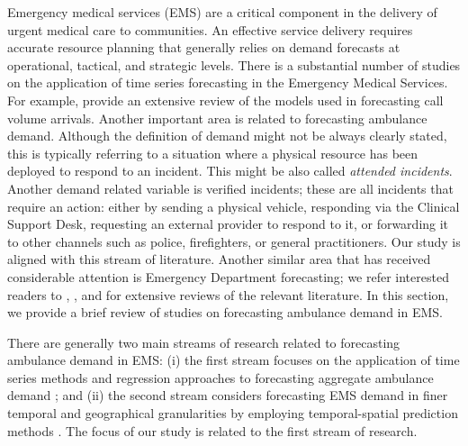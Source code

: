 \documentclass[
  authoryear,
  preprint,
  3p]{elsarticle}
\begin{document}
Emergency medical services (EMS) are a critical component in the
delivery of urgent medical care to communities. An effective service
delivery requires accurate resource planning that generally relies on
demand forecasts at operational, tactical, and strategic levels. There
is a substantial number of studies on the application of time series
forecasting in the Emergency Medical Services. For example,
\citet{ibrahim2016modeling} provide an extensive review of the models
used in forecasting call volume arrivals. Another important area is
related to forecasting ambulance demand. Although the definition of
demand might not be always clearly stated, this is typically referring
to a situation where a physical resource has been deployed to respond to
an incident. This might be also called \emph{attended incidents}.
Another demand related variable is verified incidents; these are all
incidents that require an action: either by sending a physical vehicle,
responding via the Clinical Support Desk, requesting an external
provider to respond to it, or forwarding it to other channels such as
police, firefighters, or general practitioners. Our study is aligned
with this stream of literature. Another similar area that has received
considerable attention is Emergency Department forecasting; we refer
interested readers to \citet{mingliterature2022},
\citet{gul2020exhaustive}, and \citet{wargon2009systematic} for
extensive reviews of the relevant literature. In this section, we
provide a brief review of studies on forecasting ambulance demand in
EMS.

There are generally two main streams of research related to forecasting
ambulance demand in EMS: (i) the first stream focuses on the application
of time series methods and regression approaches to forecasting
aggregate ambulance demand \citep{vile2012predicting, sasaki2010using};
and (ii) the second stream considers forecasting EMS demand in finer
temporal and geographical granularities by employing temporal-spatial
prediction methods \citep{zhou2016predicting, zhou2016predictinglit}.
The focus of our study is related to the first stream of research.
\end{document}
